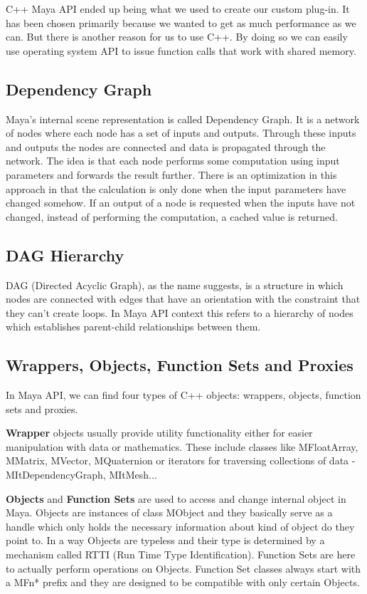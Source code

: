 \documentclass[
  digital, %
  table,   %
  nolof,     %
  nolot,     %
]{fithesis3}
\begin{document}
C++ Maya API ended up being what we used to create our custom plug-in. It has been chosen primarily because we wanted to get as much performance as we can. But there is another reason for us to use C++. By doing so we can easily use operating system API to issue function calls that work with shared memory.

\subsection{Dependency Graph}
Maya's internal scene representation is called Dependency Graph. It is a network of nodes where each node has a set of inputs and outputs. Through these inputs and outputs the nodes are connected and data is propagated through the network. The idea is that each node performs some computation using input parameters and forwards the result further. There is an optimization in this approach in that the calculation is only done when the input parameters have changed somehow. If an output of a node is requested when the inputs have not changed, instead of performing the computation, a cached value is returned.

\subsection{DAG Hierarchy}
DAG (Directed Acyclic Graph), as the name suggests, is a structure in which nodes are connected with edges that have an orientation with the constraint that they can't create loops. In Maya API context this refers to a hierarchy of nodes which establishes parent-child relationships between them.

\subsection{Wrappers, Objects, Function Sets and Proxies}
In Maya API, we can find four types of C++ objects: wrappers, objects, function sets and proxies.

\textbf{Wrapper} objects usually provide utility functionality either for easier manipulation with data or mathematics. These include classes like MFloatArray, MMatrix, MVector, MQuaternion or iterators for traversing collections of data - MItDependencyGraph, MItMesh...

\textbf{Objects} and \textbf{Function Sets} are used to access and change internal object in Maya. Objects are instances of class MObject and they basically serve as a handle which only holds the necessary information about kind of object do they point to. In a way Objects are typeless and their type is determined by a mechanism called RTTI (Run Time Type Identification). Function Sets are here to actually perform operations on Objects. Function Set classes always start with a MFn* prefix and they are designed to be compatible with only certain Objects.
\end{document}

